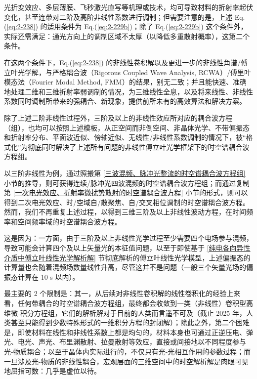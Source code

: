 光折变效应、多层薄膜、飞秒激光直写等机理或技术，均可导致材料的折射率起伏变化，甚至连带对二阶及高阶非线性系数进行调制；但需要注意的是，上述 Eq.(\ref{eq:2-238}) 的适用条件为 Eq.(\ref{eq:2-229b})；除了 Eq.(\ref{eq:2-229b}) 这个条件外，实际还需满足：通光方向上的调制区域不太厚（以降低多重散射概率），这第二个条件。

在这两个条件下，Eq.(\ref{eq:2-238}) 的非线性卷积解以及更进一步的非线性角谱/傅立叶光学解，与严格耦合波（Rigorous Coupled Wave Analysis, RCWA）/傅里叶模态法（Fourier Modal Method, FMM）的结果，别无二致；并且能快速、准确地处理二维和三维折射率弱调制的情况，为三维线性全息\cite{gerkeAperiodicVolumeOptics2010}，以及将来线性、非线性系数同时调制\cite{chenQuasiphasematchingdivisionMultiplexingHolography2021b,gerkeAperiodicVolumeOptics2010}所带来的强耦合、新现象，提供前所未有的高效算法和解决方案。

除了上述二阶非线性过程外，三阶及以上的非线性效应所对应的耦合波方程（组），也均可以按照上述模板，从正空间而非倒空间、非晶体光学、不带偏振态和折射率分布、平面波近似、傍轴近似、无线性/非线性系数调制的情况下，被“格式化”为彻底同时解决了上述所有问题的非线性傅立叶光学框架下的时空谱耦合波方程组。

以三阶非线性为例，通过照搬第 \ref{三波混频、脉冲光整流的时空谱耦合波方程组} 小节的推导，则可获得连续/脉冲光四波混频的时空谱耦合波方程组；而通过复制第 \ref{一次电光效应、折射率微扰势散射的时空谱耦合波方程} 小节的形式，则可以得到二次电光效应、时/空域自/散聚焦、自/交叉相位调制的时空谱耦合波方程。然而，我们不再重复上述过程，以得到三维三阶及以上非线性波动方程，在时间频率和空间频率域的时空谱耦合波方程。

这是因为：一方面，由于三阶及以上非线性光学过程至少需要四个电场参与混频，导致可能会计算四个及以上矢量光的本征值问题，以至于即使基于 \ref{纯电各向异性介质中傅立叶线性光学解析解} 节彻底解析的傅立叶线性光学模型，上述偏振态的计算量也会随着混频场数量线性升高，尽管这并不是问题（一般三个矢量光场的偏振态计算在 10 s 以内）。

最主要的 2 个限制是：其一，从后续对非线性卷积解的线性卷积化的经验上来看，任何带耦合的时空谱耦合波方程组，最终都会收敛到一类（非线性）卷积型高维微-积分方程组，它们的解析解对于目前的人类而言遥不可及（截止 2025 年，人类甚至只能得到少数特殊形式的一维积分方程的封闭解）；除此之外，第二个困难是，即使材料在线性和非线性系数上都是均匀的，材料本身也可通过正逆压电、弹光、电光、声光、布里渊散射、拉曼散射等效应，直接或间接地以不同程度参与光-物质耦合；以至于晶体内实际进行的，不仅只有光-光相互作用的参数过程；而一旦涉及光-物质的非线性耦合，宏观层面的三维空间中的时空解析解是肉眼可见地屈指可数：几乎是虚位以待。

